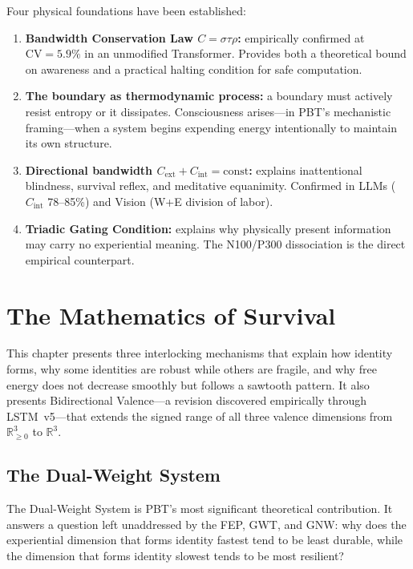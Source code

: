 \documentclass[12pt,a4paper]{article}
\newcommand{\Cext}{C_{\mathrm{ext}}}
\newcommand{\Cint}{C_{\mathrm{int}}}
\begin{document}
Four physical foundations have been established:

\begin{enumerate}[leftmargin=1.8em]
  \item \textbf{Bandwidth Conservation Law $C = \sigma\tau\rho$:}
    empirically confirmed at $\mathrm{CV} = 5.9\%$ in an unmodified
    Transformer. Provides both a theoretical bound on awareness and a practical
    halting condition for safe computation.
  \item \textbf{The boundary as thermodynamic process:}
    a boundary must actively resist entropy or it dissipates. Consciousness
    arises---in PBT's mechanistic framing---when a system begins expending
    energy intentionally to maintain its own structure.
  \item \textbf{Directional bandwidth $\Cext + \Cint = \mathrm{const}$:}
    explains inattentional blindness, survival reflex, and meditative
    equanimity. Confirmed in LLMs ($\Cint$ 78--85\%) and Vision
    (W+E division of labor).
  \item \textbf{Triadic Gating Condition:}
    explains why physically present information may carry no experiential
    meaning. The N100/P300 dissociation is the direct empirical counterpart.
\end{enumerate}

\section{The Mathematics of Survival}
\label{sec:mathematics}

This chapter presents three interlocking mechanisms that explain how identity
forms, why some identities are robust while others are fragile, and why free
energy does not decrease smoothly but follows a sawtooth pattern. It also
presents Bidirectional Valence---a revision discovered empirically through
LSTM~v5---that extends the signed range of all three valence dimensions from
$\mathbb{R}^3_{\ge 0}$ to $\mathbb{R}^3$.

\subsection{The Dual-Weight System}

The Dual-Weight System is PBT's most significant theoretical contribution. It
answers a question left unaddressed by the FEP, GWT, and GNW: why does the
experiential dimension that forms identity fastest tend to be least durable,
while the dimension that forms identity slowest tends to be most resilient?
\end{document}

